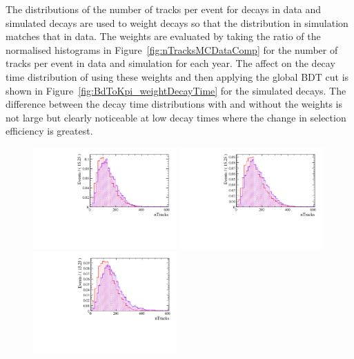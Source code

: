 The distributions of the number of tracks per event for \bdkpi decays in data and simulated decays are used to weight \bdkpi decays so that the distribution in simulation matches that in data. The weights are evaluated by taking the ratio of the normalised histograms in Figure~\ref{fig:nTracksMCDataComp} for the number of tracks per event in data and simulation for each year. The affect on the decay time distribution of using these weights and then applying the global BDT cut is shown in Figure~\ref{fig:BdToKpi_weightDecayTime} for the simulated \bdkpi decays. The difference between the decay time distributions with and without the weights is not large but clearly noticeable at low decay times where the change in selection efficiency is greatest. 


\begin{figure}[htbp]
  \centering
    \includegraphics[width=0.49\textwidth]{./Figs/LifetimeMeasurement/Bd2KPi_2011_data_MC_nTracks.pdf}
    \includegraphics[width=0.49\textwidth]{./Figs/LifetimeMeasurement/Bd2KPi_2012_data_MC_nTracks.pdf}
    \includegraphics[width=0.49\textwidth]{./Figs/LifetimeMeasurement/Bd2KPi_2015_data_MC_nTracks.pdf}

\end{figure}
